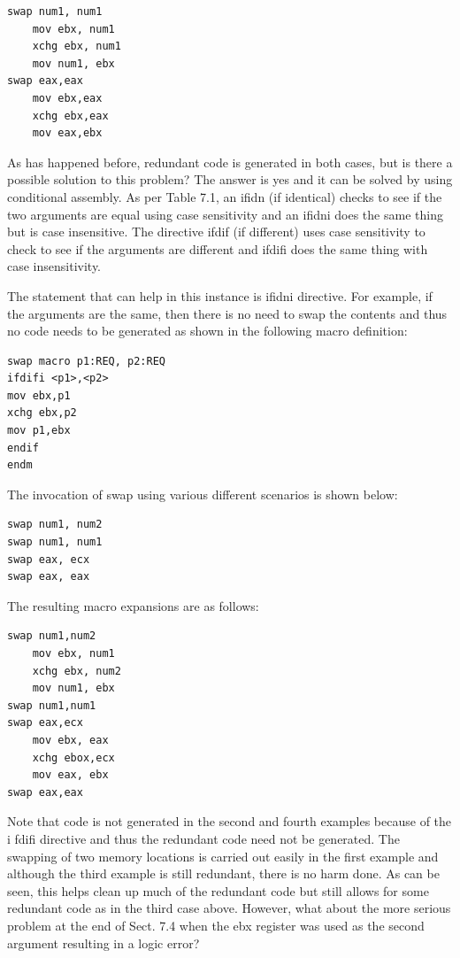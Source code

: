 \documentclass[10pt]{article}
\begin{document}
\begin{verbatim}
swap num1, num1
    mov ebx, num1
    xchg ebx, num1
    mov num1, ebx
swap eax,eax
    mov ebx,eax
    xchg ebx,eax
    mov eax,ebx
\end{verbatim}

As has happened before, redundant code is generated in both cases, but is there a possible solution to this problem? The answer is yes and it can be solved by using conditional assembly. As per Table 7.1, an ifidn (if identical) checks to see if the two arguments are equal using case sensitivity and an ifidni does the same thing but is case insensitive. The directive ifdif (if different) uses case sensitivity to check to see if the arguments are different and ifdifi does the same thing with case insensitivity.

The statement that can help in this instance is ifidni directive. For example, if the arguments are the same, then there is no need to swap the contents and thus no code needs to be generated as shown in the following macro definition:

\begin{verbatim}
swap macro p1:REQ, p2:REQ
ifdifi <p1>,<p2>
mov ebx,p1
xchg ebx,p2
mov p1,ebx
endif
endm
\end{verbatim}

The invocation of swap using various different scenarios is shown below:

\begin{verbatim}
swap num1, num2
swap num1, num1
swap eax, ecx
swap eax, eax
\end{verbatim}

The resulting macro expansions are as follows:

\begin{verbatim}
swap num1,num2
    mov ebx, num1
    xchg ebx, num2
    mov num1, ebx
swap num1,num1
swap eax,ecx
    mov ebx, eax
    xchg ebox,ecx
    mov eax, ebx
swap eax,eax
\end{verbatim}

Note that code is not generated in the second and fourth examples because of the i fdifi directive and thus the redundant code need not be generated. The swapping of two memory locations is carried out easily in the first example and although the third example is still redundant, there is no harm done. As can be seen, this helps clean up much of the redundant code but still allows for some redundant code as in the third case above. However, what about the more serious problem at the end of Sect. 7.4 when the ebx register was used as the second argument resulting in a logic error?
\end{document}
